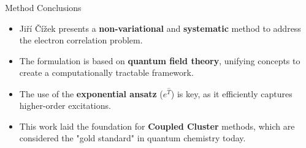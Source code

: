 \begin{frame}{Method Conclusions}
    \begin{itemize}
        \item Jiří Čížek presents a \textbf{non-variational} and \textbf{systematic} method to address the electron correlation problem.
        \pause
        \bigskip
        \item The formulation is based on \textbf{quantum field theory}, unifying concepts to create a computationally tractable framework.
        \pause
        \bigskip
        \item The use of the \textbf{exponential ansatz} ($e^{\hat{T}}$) is key, as it efficiently captures higher-order excitations.
        \pause
        \bigskip
        \item This work laid the foundation for \textbf{Coupled Cluster} methods, which are considered the "gold standard" in quantum chemistry today.
    \end{itemize}
\end{frame}